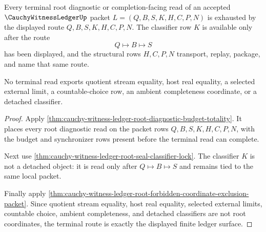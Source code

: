 \begin{theorem}
\label{thm:cauchy-witness-ledger-root-terminal-route-exhaustion}
Every terminal root diagnostic or completion-facing read of an accepted $\CauchyWitnessLedgerUp$ packet $L=(Q,B,S,K,H,C,P,N)$ is exhausted by the displayed route $Q,B,S,K,H,C,P,N$. The classifier row $K$ is available only after the route
$$
Q \longmapsto B \longmapsto S
$$
has been displayed, and the structural rows $H,C,P,N$ transport, replay, package, and name that same route.

No terminal read exports quotient stream equality, host real equality, a selected external limit, a countable-choice row, an ambient completeness coordinate, or a detached classifier.
\end{theorem}
\begin{proof}
Apply \autoref{thm:cauchy-witness-ledger-root-diagnostic-budget-totality}. It places every root diagnostic read on the packet rows $Q,B,S,K,H,C,P,N$, with the budget and synchronizer rows present before the terminal read can complete.

Next use \autoref{thm:cauchy-witness-ledger-root-seal-classifier-lock}. The classifier $K$ is not a detached object: it is read only after $Q \longmapsto B \longmapsto S$ and remains tied to the same local packet.

Finally apply \autoref{thm:cauchy-witness-ledger-root-forbidden-coordinate-exclusion-packet}. Since quotient stream equality, host real equality, selected external limits, countable choice, ambient completeness, and detached classifiers are not root coordinates, the terminal route is exactly the displayed finite ledger surface.
\end{proof}

